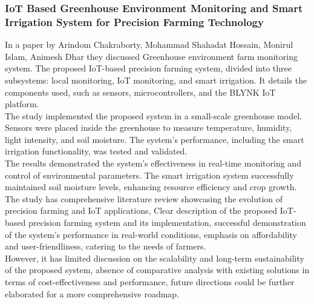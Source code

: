 \documentclass[12pt, a4paper]{article}
\begin{document}
\subsubsection{IoT Based Greenhouse Environment Monitoring and Smart Irrigation System for Precision Farming Technology}
In a paper by Arindom Chakraborty, Mohammad Shahadat Hossain, Monirul Islam, Animesh Dhar \cite{chakraborty2022iot} they discussed Greenhouse environment farm monitoring system.
The proposed IoT-based precision farming system, divided into three subsystems: local monitoring, IoT monitoring, and smart irrigation. It details the components used, such as sensors, microcontrollers, and the BLYNK IoT platform.\\
The study implemented the proposed system in a small-scale greenhouse model. Sensors were placed inside the greenhouse to measure temperature, humidity, light intensity, and soil moisture. The system's performance, including the smart irrigation functionality, was tested and validated.\\
The results demonstrated the system's effectiveness in real-time monitoring and control of environmental parameters. The smart irrigation system successfully maintained soil moisture levels, enhancing resource efficiency and crop growth.\\
The study has comprehensive literature review showcasing the evolution of precision farming and IoT applications, Clear description of the proposed IoT-based precision farming system and its implementation, successful demonstration of the system's performance in real-world conditions, emphasis on affordability and user-friendliness, catering to the needs of farmers.\\
However, it has limited discussion on the scalability and long-term sustainability of the proposed system,
absence of comparative analysis with existing solutions in terms of cost-effectiveness and performance, future directions could be further elaborated for a more comprehensive roadmap.
\end{document}
